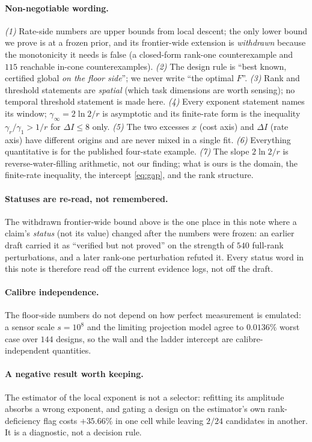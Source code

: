 \documentclass[journal]{IEEEtran}
\theoremstyle{remark}
\begin{document}
\paragraph{Non-negotiable wording.}
\emph{(1)} Rate-side numbers are upper bounds from local descent; the only
lower bound we prove is at a frozen prior, and its frontier-wide extension is
\emph{withdrawn} because the monotonicity it needs is false (a closed-form
rank-one counterexample and $115$ reachable in-cone counterexamples).
\emph{(2)} The design rule is ``best known, certified global \emph{on the floor
side}''; we never write ``the optimal $F$''.
\emph{(3)} Rank and threshold statements are \emph{spatial} (which task
dimensions are worth sensing); no temporal threshold statement is made here.
\emph{(4)} Every exponent statement names its window; $\gamma_\infty=2\ln2/r$ is
asymptotic and its finite-rate form is the inequality
$\gamma_r/\gamma_1>1/r$ for $\Delta I\le8$ only.
\emph{(5)} The two excesses $x$ (cost axis) and $\Delta I$ (rate axis) have
different origins and are never mixed in a single fit.
\emph{(6)} Everything quantitative is for the published four-state example.
\emph{(7)} The slope $2\ln2/r$ is reverse-water-filling arithmetic, not our
finding; what is ours is the domain, the finite-rate inequality, the intercept
\eqref{eq:gap}, and the rank structure.

\paragraph{Statuses are re-read, not remembered.} The withdrawn frontier-wide
bound above is the one place in this note where a claim's \emph{status} (not its
value) changed after the numbers were frozen: an earlier draft carried it as
``verified but not proved'' on the strength of $540$ full-rank perturbations, and
a later rank-one perturbation refuted it. Every status word in this note is
therefore read off the current evidence logs, not off the draft.

\paragraph{Calibre independence.} The floor-side numbers do not depend on how
perfect measurement is emulated: a sensor scale $s=10^8$ and the limiting
projection model agree to $0.0136\%$ worst case over $144$ designs, so the wall
and the ladder intercept are calibre-independent quantities.

\paragraph{A negative result worth keeping.} The estimator of the local exponent
is not a selector: refitting its amplitude absorbs a wrong exponent, and gating a
design on the estimator's own rank-deficiency flag costs $+35.66\%$ in one cell
while leaving $2/24$ candidates in another. It is a diagnostic, not a decision
rule.
\end{document}
